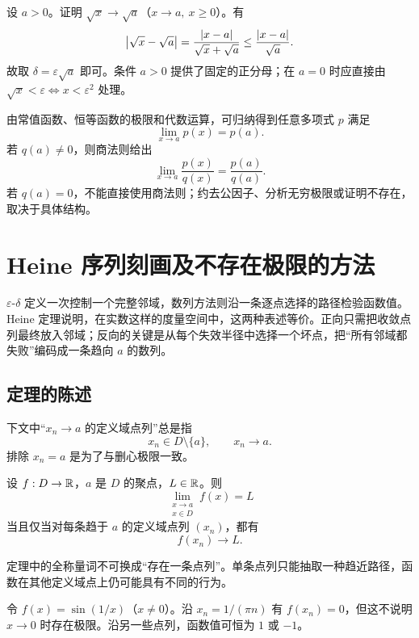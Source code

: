 \begin{example}[根式有理化]
设 \(a>0\)。证明 \(\sqrt{x}\to\sqrt a\)（\(x\to a,\ x\ge0\)）。有
\[
 \left|\sqrt x-\sqrt a\right|
 =\frac{\left|x-a\right|}{\sqrt x+\sqrt a}
 \le\frac{\left|x-a\right|}{\sqrt a}.
\]
故取 \(\delta=\varepsilon\sqrt a\) 即可。条件 \(a>0\) 提供了固定的正分母；在 \(a=0\) 时应直接由 \(\sqrt x<\varepsilon\Longleftrightarrow x<\varepsilon^2\) 处理。
\end{example}

\begin{example}[多项式与有理函数]
由常值函数、恒等函数的极限和代数运算，可归纳得到任意多项式 \(p\) 满足
\[
 \lim_{x\to a}p(x)=p(a).
\]
若 \(q(a)\ne0\)，则商法则给出
\[
 \lim_{x\to a}\frac{p(x)}{q(x)}=\frac{p(a)}{q(a)}.
\]
若 \(q(a)=0\)，不能直接使用商法则；约去公因子、分析无穷极限或证明不存在，取决于具体结构。
\end{example}

\section{Heine 序列刻画及不存在极限的方法}

\(\varepsilon\)-\(\delta\) 定义一次控制一个完整邻域，数列方法则沿一条逐点选择的路径检验函数值。Heine 定理说明，在实数这样的度量空间中，这两种表述等价。正向只需把收敛点列最终放入邻域；反向的关键是从每个失效半径中选择一个坏点，把“所有邻域都失败”编码成一条趋向 \(a\) 的数列。

\subsection{定理的陈述}

下文中“\(x_n\to a\) 的定义域点列”总是指
\[
 x_n\in D\setminus\{a\},\qquad x_n\to a.
\]
排除 \(x_n=a\) 是为了与删心极限一致。

\begin{theorem}[Heine 定理]
设 \(f:D\to\mathbb{R}\)，\(a\) 是 \(D\) 的聚点，\(L\in\mathbb{R}\)。则
\[
 \lim_{\substack{x\to a\\x\in D}}f(x)=L
\]
当且仅当对每条趋于 \(a\) 的定义域点列 \((x_n)\)，都有
\[
 f(x_n)\to L.
\]
\end{theorem}

定理中的全称量词不可换成“存在一条点列”。单条点列只能抽取一种趋近路径，函数在其他定义域点上仍可能具有不同的行为。

\begin{counterexample}
令 \(f(x)=\sin(1/x)\)（\(x\ne0\)）。沿 \(x_n=1/(\pi n)\) 有 \(f(x_n)=0\)，但这不说明 \(x\to0\) 时存在极限。沿另一些点列，函数值可恒为 \(1\) 或 \(-1\)。
\end{counterexample}

